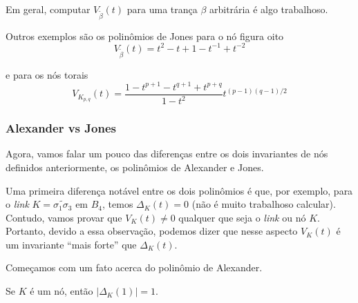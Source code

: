 	\par\vspace{0.3cm} Em geral, computar $V_{\widetilde{\beta}}(t)$ para uma trança $\beta$ arbitrária é algo trabalhoso.
	\par\vspace{0.3cm} Outros exemplos são os polinômios de Jones para o nó figura oito 
	\begin{equation*}
	V_{\widetilde{\beta}}(t) = t^2 - t + 1 - t^{-1} + t^{-2}  
	\end{equation*}
	\par\vspace{0.3cm} e para os nós torais
	\begin{equation*}
	V_{K_{p,q}}(t) = \frac{1-t^{p+1}-t^{q+1} + t^{p+q}}{1-t^2}t^{(p-1)(q-1)/2}
	\end{equation*}
	\subsubsection{Alexander vs Jones}
	\hspace{12pt} Agora, vamos falar um pouco das diferenças entre os dois invariantes de nós definidos anteriormente, os polinômios de Alexander e Jones.
	\par\vspace{0.3cm} Uma primeira diferença notável entre os dois polinômios é que, por exemplo, para o \textit{link} $K = \widetilde{\sigma_1\sigma_3}$ em $B_4$, temos $\Delta_K(t) = 0$ (não é muito trabalhoso calcular). Contudo, vamos provar que $V_K(t)\neq 0$ qualquer que seja o \textit{link} ou nó $K$. Portanto, devido a essa observação, podemos dizer que nesse aspecto $V_K(t)$ é um invariante ``mais forte'' que $\Delta_K(t)$. 
	\par\vspace{0.3cm} Começamos com um fato acerca do polinômio de Alexander.
	\begin{prop}
		\label{polinomio de Alexander para t=1}
		Se $K$ é um nó, então $|\Delta_K(1)|=1$.
	\end{prop}

